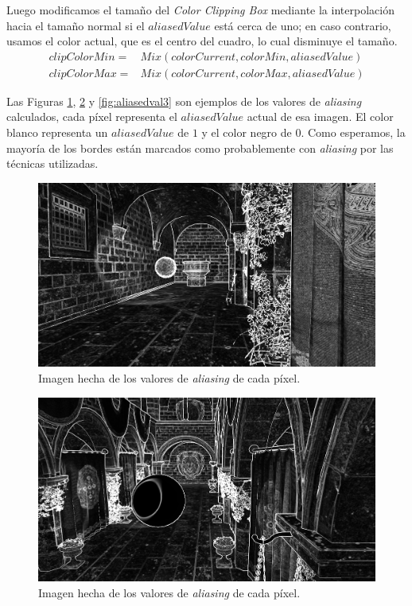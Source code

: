 \documentclass[pregrado]{tesis-usb} %
\begin{document}
Luego modificamos el tamaño del \textit{Color Clipping Box} mediante la interpolación hacia el tamaño normal si el $aliasedValue$ está cerca de uno; en caso contrario, usamos el color actual, que es el centro del cuadro, lo cual disminuye el tamaño.
\begin{equation}\label{eq:clipredux}
\begin{split}
	clipColorMin= & Mix(colorCurrent,colorMin,aliasedValue) \\
	clipColorMax= & Mix(colorCurrent,colorMax,aliasedValue)
\end{split}
\end{equation}



Las Figuras \ref{fig:aliasedval1}, \ref{fig:aliasedval2} y \ref{fig:aliasedval3} son ejemplos de los valores de \textit{aliasing} calculados, cada píxel representa el $aliasedValue$ actual de esa imagen. El color blanco representa un $aliasedValue$ de $1$ y el color negro de $0$. Como esperamos, la mayoría de los bordes están marcados como probablemente con \textit{aliasing} por las técnicas utilizadas.

\begin{figure}[H]
	\centering
	\includegraphics[scale=0.2]{images/aliased_value_example_1_temporal.png}
	\caption{Imagen hecha de los valores de \textit{aliasing} de cada píxel.}\label{fig:aliasedval1}
\end{figure}

\begin{figure}[H]
	\centering
	\includegraphics[scale=0.2]{images/aliased_value_example_2_temporal.png}
	\caption{Imagen hecha de los valores de \textit{aliasing} de cada píxel.}\label{fig:aliasedval2}
\end{figure}
\end{document}
